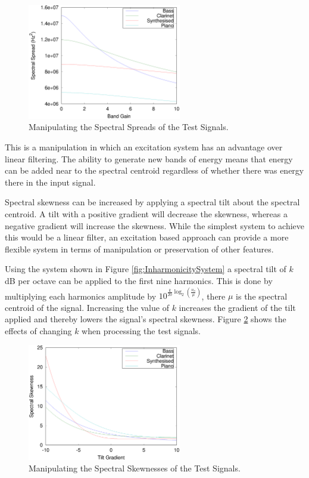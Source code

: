 			\begin{figure}[h!]
				\centering
				\includegraphics[width=0.6\textwidth]{chapter6/Images/MoveSpreads.eps}
				\caption{Manipulating the Spectral Spreads of the Test Signals.}
				\label{fig:MoveSpreads}
			\end{figure}

			This is a manipulation in which an excitation system has an advantage over linear filtering. The
			ability to generate new bands of energy means that energy can be added near to the spectral
			centroid regardless of whether there was energy there in the input signal.

			Spectral skewness can be increased by applying a spectral tilt about the spectral centroid. A tilt
			with a positive gradient will decrease the skewness, whereas a negative gradient will increase the
			skewness. While the simplest system to achieve this would be a linear filter, an excitation based
			approach can provide a more flexible system in terms of manipulation or preservation of other
			features.

			Using the system shown in Figure \ref{fig:InharmonicitySystem} a spectral tilt of $k$ dB per octave
			can be applied to the first nine harmonics. This is done by multiplying each harmonics amplitude by
			$10^{\frac{k}{20}\log_{2} \left( \frac{\nu_{n}}{\mu} \right)}$, there $\mu$ is the spectral
			centroid of the signal. Increasing the value of $k$ increases the gradient of the tilt applied and
			thereby lowers the signal's spectral skewness. Figure \ref{fig:MoveSkewnesses} shows the effects of
			changing $k$ when processing the test signals.

			\begin{figure}[h!]
				\centering
				\includegraphics[width=0.6\textwidth]{chapter6/Images/MoveSkewnesses.eps}
				\caption{Manipulating the Spectral Skewnesses of the Test Signals.}
				\label{fig:MoveSkewnesses}
			\end{figure}

